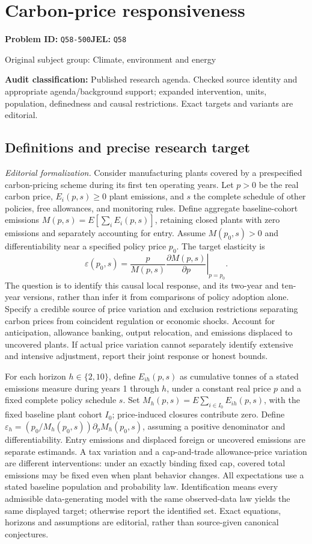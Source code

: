 \documentclass[11pt,a4paper]{article}
\begin{document}
\section*{Carbon-price responsiveness}
\textbf{Problem ID:} \texttt{Q58-500}\quad \textbf{JEL:} \texttt{Q58}\par
\label{problem:OP-0435}
{\sffamily\small\color{muted}Original subject group: Climate, environment and energy\par}
\label{definitions:problem:30007717}
\textbf{Audit classification:} Published research agenda. Checked source identity and appropriate agenda/background support; expanded intervention, units, population, definedness and causal restrictions. Exact targets and variants are editorial.
\subsection*{Definitions and precise research target}
\textit{Editorial formalization.} Consider manufacturing plants covered by a prespecified carbon-pricing scheme during its first ten operating years. Let \(p>0\) be the real carbon price, \(E_i(p,s)\geq0\) plant emissions, and \(s\) the complete schedule of other policies, free allowances, and monitoring rules. Define aggregate baseline-cohort emissions \(M(p,s)=E[\sum_i E_i(p,s)]\), retaining closed plants with zero emissions and separately accounting for entry. Assume \(M(p_0,s)>0\) and differentiability near a specified policy price \(p_0\). The target elasticity is
\[\varepsilon(p_0,s)=\left.\frac{p}{M(p,s)}\frac{\partial M(p,s)}{\partial p}\right|_{p=p_0}.\]
The question is to identify this causal local response, and its two-year and ten-year versions, rather than infer it from comparisons of policy adoption alone. Specify a credible source of price variation and exclusion restrictions separating carbon prices from coincident regulation or economic shocks. Account for anticipation, allowance banking, output relocation, and emissions displaced to uncovered plants. If actual price variation cannot separately identify extensive and intensive adjustment, report their joint response or honest bounds.

For each horizon \(h\in\{2,10\}\), define \(E_{ih}(p,s)\) as cumulative tonnes of a stated emissions measure during years 1 through \(h\), under a constant real price \(p\) and a fixed complete policy schedule \(s\). Set \(M_h(p,s)=E\sum_{i\in I_0}E_{ih}(p,s)\), with the fixed baseline plant cohort \(I_0\); price-induced closures contribute zero. Define \(\varepsilon_h=(p_0/M_h(p_0,s))\partial_pM_h(p_0,s)\), assuming a positive denominator and differentiability. Entry emissions and displaced foreign or uncovered emissions are separate estimands. A tax variation and a cap-and-trade allowance-price variation are different interventions: under an exactly binding fixed cap, covered total emissions may be fixed even when plant behavior changes. All expectations use a stated baseline population and probability law. Identification means every admissible data-generating model with the same observed-data law yields the same displayed target; otherwise report the identified set. Exact equations, horizons and assumptions are editorial, rather than source-given canonical conjectures.
\end{document}
